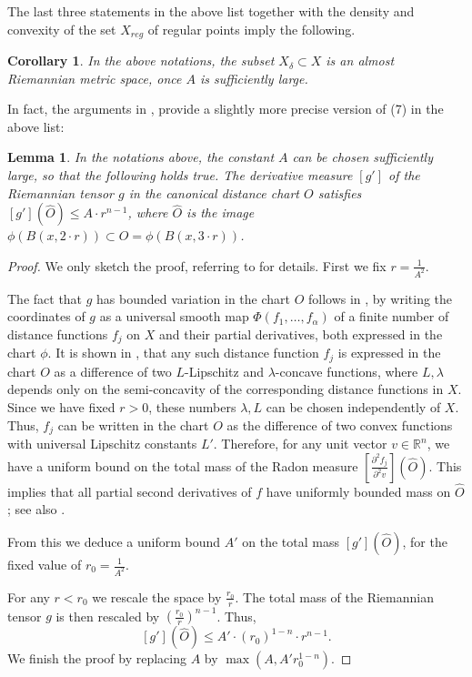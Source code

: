 \documentclass[12pt,leqno,intlimits]{amsart}
\numberwithin{equation}{section}
\newtheorem{lem}[thm]{Lemma}
\newtheorem{cor}[thm]{Corollary}
\theoremstyle{definition}
\theoremstyle{remark}
\newcommand{\R}{\mathbb{R}}
\begin{document}
The last three statements in the above list together with the density and convexity of the set $X_{reg}$ of regular points imply the following.

\begin{cor}
In the above notations, the subset $X_{\delta} \subset X$ is an almost Riemannian metric space, once $A$ is sufficiently large.
\end{cor}

In fact, the arguments in \cite[4.2]{Per-DC}, provide a slightly more precise version of (7) in the above list:

\begin{lem} \label{lem:A}
In the notations above, the constant $A$ can be chosen sufficiently large, so that the following holds true.
The derivative measure $[g']$ of the Riemannian tensor $g$
in the canonical distance chart $O$ satisfies $[g'] (\hat O) \leq A \cdot r^{n-1} $, where $\hat O$ is the image $\phi (B (x,{2{\cdot}r})) \subset O=
\phi (B (x,{3{\cdot}r}))$.
\end{lem}

\begin{proof}
We only sketch the proof, referring to \cite{Per-DC} for details.
First we fix $r=\frac 1 {A^2}$.

The fact that $g$ has bounded variation in the chart $O$ follows in \cite[Section 4.2]{Per-DC}, by writing the coordinates of $g$
as a universal smooth map $\Phi (f_1,\dots,f_{\alpha})$ of a finite number of distance functions $f_j$ on $X$ and their partial derivatives, both expressed in the chart $\phi$.
It is shown in \cite[Section 3]{Per-DC}, that any such distance function $f_j$ is expressed in the chart $O$ as a difference of two $L$-Lipschitz and $\lambda$-concave functions, where $L,\lambda$ depends only on the semi-concavity of the corresponding distance functions in $X$. Since we have fixed $r>0$, these numbers $\lambda,L$ can be chosen independently of $X$.
Thus, $f_j$ can be written in the chart $O$ as the difference of two convex functions with universal Lipschitz constants $L'$.
Therefore, for any unit vector $v\in \R^n$, we have a uniform bound on the total mass of the
Radon measure $[\frac {\partial ^2 f_j} {\partial ^2v}] (\hat O)$.
This implies that all partial second derivatives of $f$ have uniformly bounded mass on $\hat O$; see also \cite[Theorem 6.8]{Evans}.

From this we deduce a uniform bound $A'$ on the total mass $[g'] (\hat O)$, for the fixed value of $r_0=\frac 1 {A^2}$.

For any $r<r_0$ we rescale the space by $\frac {r_0} r$. The total mass of the Riemannian tensor $g$ is then rescaled
by $(\frac {r_0} r)^{n-1}$. Thus, $$[g'] (\hat O) \leq A'\cdot (r_0 ) ^{1-n} \cdot r^{n-1}  .$$
We finish the proof by replacing $A$ by $\max(A, A' r_0^{1-n})$.
\end{proof}
\end{document}
